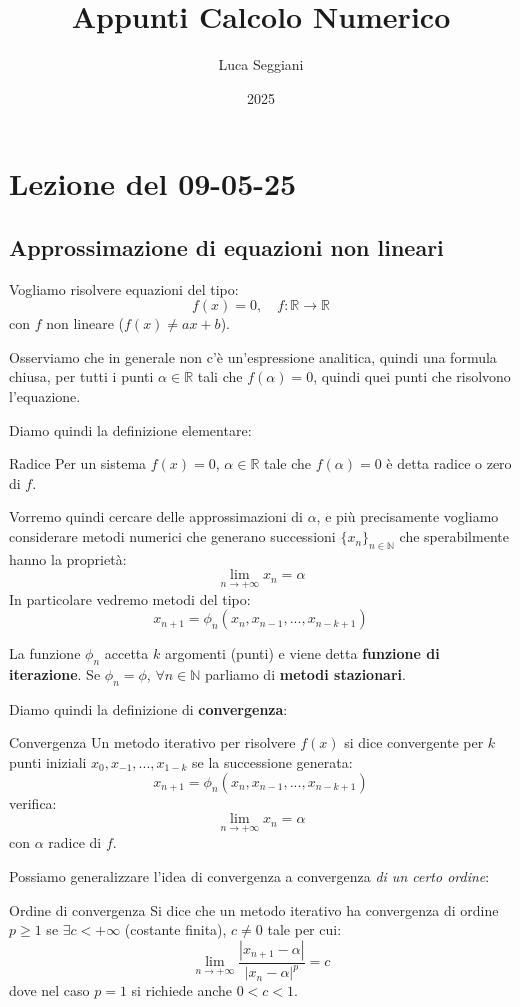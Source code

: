 \documentclass[a4paper,11pt]{article}
\title{Appunti Calcolo Numerico}
\author{Luca Seggiani}
\date{2025}
\begin{document}
\section{Lezione del 09-05-25}

\thispagestyle{empty}
\pagestyle{fancy}

\subsection{Approssimazione di equazioni non lineari}
Vogliamo risolvere equazioni del tipo:
$$
f(x) = 0, \quad f : \mathbb{R} \rightarrow \mathbb{R}
$$
con $f$ non lineare ($f(x) \neq ax + b$).

Osserviamo che in generale non c'è un'espressione analitica, quindi una formula chiusa, per tutti i punti $\alpha \in \mathbb{R}$ tali che $f(\alpha) = 0$, quindi quei punti che risolvono l'equazione.

Diamo quindi la definizione elementare:
\begin{definition}{Radice}
	Per un sistema $f(x) = 0$, $\alpha \in \mathbb{R}$ tale che $f(\alpha) = 0$ è detta radice o zero di $f$.
\end{definition}

Vorremo quindi cercare delle approssimazioni di $\alpha$, e più precisamente vogliamo considerare metodi numerici che generano successioni $\{x_n\}_{n \in \mathbb{N}}$ che sperabilmente hanno la proprietà:
$$
\lim_{n \rightarrow + \infty} x_n = \alpha
$$
In particolare vedremo metodi del tipo:
$$
x_{n + 1} = \phi_n (x_n, x_{n - 1}, ..., x_{n - k + 1})
$$

La funzione $\phi_n$ accetta $k$ argomenti (punti) e viene detta \textbf{funzione di iterazione}.
Se $\phi_n = \phi$, $\forall n \in \mathbb{N}$ parliamo di \textbf{metodi stazionari}.

Diamo quindi la definizione di \textbf{convergenza}:
\begin{definition}{Convergenza}
	Un metodo iterativo per risolvere $f(x)$ si dice convergente per $k$ punti iniziali $x_0, x_{-1}, ..., x_{1-k}$ se la successione generata:
	$$
	x_{n + 1} = \phi_n (x_n, x_{n - 1}, ..., x_{n - k + 1})
	$$
	verifica:
	$$
	\lim_{n \rightarrow + \infty} x_n = \alpha
	$$
	con $\alpha$ radice di $f$.
\end{definition}

Possiamo generalizzare l'idea di convergenza a convergenza \textit{di un certo ordine}:
\begin{definition}{Ordine di convergenza}
	Si dice che un metodo iterativo ha convergenza di ordine $p \geq 1$ se $\exists c < +\infty$ (costante finita), $c \neq 0$ tale per cui:
	$$
	\lim_{n \rightarrow +\infty} \frac{|x_{n + 1} - \alpha|}{|x_n - \alpha|^p} = c
	$$
	dove nel caso $p = 1$ si richiede anche $0 < c < 1$.
\end{definition}
\end{document}

